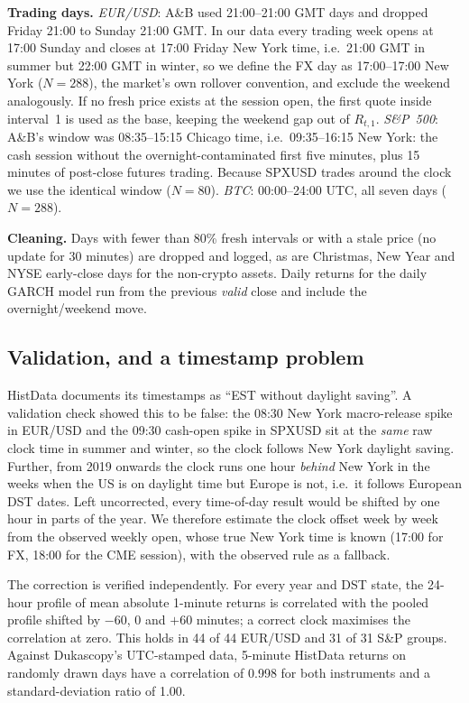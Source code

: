 \documentclass[11pt,a4paper]{article}
\begin{document}
\textbf{Trading days.} \emph{EUR/USD}: A\&B used 21:00--21:00 GMT days and dropped Friday 21:00 to Sunday 21:00 GMT. In our data every trading week opens at 17:00 Sunday and closes at 17:00 Friday New York time, i.e.\ 21:00 GMT in summer but 22:00 GMT in winter, so we define the FX day as 17:00--17:00 New York ($N=288$), the market's own rollover convention, and exclude the weekend analogously. If no fresh price exists at the session open, the first quote inside interval~1 is used as the base, keeping the weekend gap out of $R_{t,1}$. \emph{S\&P~500}: A\&B's window was 08:35--15:15 Chicago time, i.e.\ 09:35--16:15 New York: the cash session without the overnight-contaminated first five minutes, plus 15 minutes of post-close futures trading. Because SPXUSD trades around the clock we use the identical window ($N=80$). \emph{BTC}: 00:00--24:00 UTC, all seven days ($N=288$).

\textbf{Cleaning.} Days with fewer than 80\% fresh intervals or with a stale price (no update for 30 minutes) are dropped and logged, as are Christmas, New Year and NYSE early-close days for the non-crypto assets. Daily returns for the daily GARCH model run from the previous \emph{valid} close and include the overnight/weekend move.

\subsection{Validation, and a timestamp problem}
\label{sec:clock}
HistData documents its timestamps as ``EST without daylight saving''. A validation check showed this to be false: the 08:30 New York macro-release spike in EUR/USD and the 09:30 cash-open spike in SPXUSD sit at the \emph{same} raw clock time in summer and winter, so the clock follows New York daylight saving. Further, from 2019 onwards the clock runs one hour \emph{behind} New York in the weeks when the US is on daylight time but Europe is not, i.e.\ it follows European DST dates. Left uncorrected, every time-of-day result would be shifted by one hour in parts of the year. We therefore estimate the clock offset week by week from the observed weekly open, whose true New York time is known (17:00 for FX, 18:00 for the CME session), with the observed rule as a fallback.

The correction is verified independently. For every year and DST state, the 24-hour profile of mean absolute 1-minute returns is correlated with the pooled profile shifted by $-60$, $0$ and $+60$ minutes; a correct clock maximises the correlation at zero. This holds in 44 of 44 EUR/USD and 31 of 31 S\&P groups. Against Dukascopy's UTC-stamped data, 5-minute HistData returns on randomly drawn days have a correlation of 0.998 for both instruments and a standard-deviation ratio of 1.00.
\end{document}
